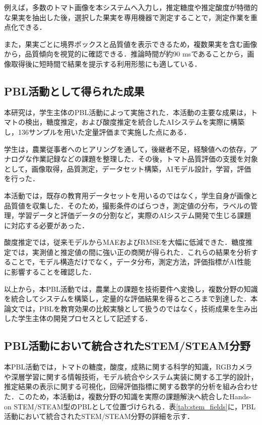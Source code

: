 \documentclass[authorproof,JRM,paper]{fujipressarticle}
\begin{document}
例えば，多数のトマト画像を本システムへ入力し，推定糖度や推定酸度が特徴的な果実を抽出した後，選択した果実を専用機器で測定することで，測定作業を重点化できる．

また，果実ごとに境界ボックスと品質値を表示できるため，複数果実を含む画像から，品質傾向を視覚的に確認できる．推論時間が約90 msであることから，画像取得後に短時間で結果を提示する利用形態にも適している．

\subsection{PBL活動として得られた成果}

本研究は，学生主体のPBL活動によって実施された．本活動の主要な成果は，トマトの検出，糖度推定，および酸度推定を統合したAIシステムを実際に構築し，136サンプルを用いた定量評価まで実施した点にある．

学生は，農業従事者へのヒアリングを通して，後継者不足，経験値への依存，アナログな作業記録などの課題を整理した．その後，トマト品質評価の支援を対象として，画像取得，品質測定，データセット構築，AIモデル設計，学習，評価を行った．

本活動では，既存の教育用データセットを用いるのではなく，学生自身が画像と品質値を収集した．そのため，撮影条件のばらつき，測定値の分布，ラベルの管理，学習データと評価データの分割など，実際のAIシステム開発で生じる課題に対応する必要があった．

酸度推定では，従来モデルからMAEおよびRMSEを大幅に低減できた．糖度推定では，実測値と推定値の間に強い正の商関が得られた．これらの結果を分析することで，モデル構造だけでなく，データ分布，測定方法，評価指標がAI性能に影響することを確認した．

以上から，本PBL活動では，農業上の課題を技術要件へ変換し，複数分野の知識を統合してシステムを構築し，定量的な評価結果を得るところまで到達した．本論文では，PBLを教育効果の比較実験として扱うのではなく，技術成果を生み出した学生主体の開発プロセスとして記述する．

\subsection{PBL活動において統合されたSTEM/STEAM分野}

本PBL活動では，トマトの糖度，酸度，成熟に関する科学的知識，RGBカメラや深層学習に関する情報技術，モデル統合やシステム実装に関する工学的設計，推定結果の表示に関する可視化，回帰評価指標に関する数学的分析を組み合わせた．このため，本活動は，複数分野の知識を実際の課題解決へ統合したHands-on STEM/STEAM型のPBLとして位置づけられる．表\ref{tab:stem_fields}に，PBL活動において統合されたSTEM/STEAM分野の詳細を示す．
\end{document}
